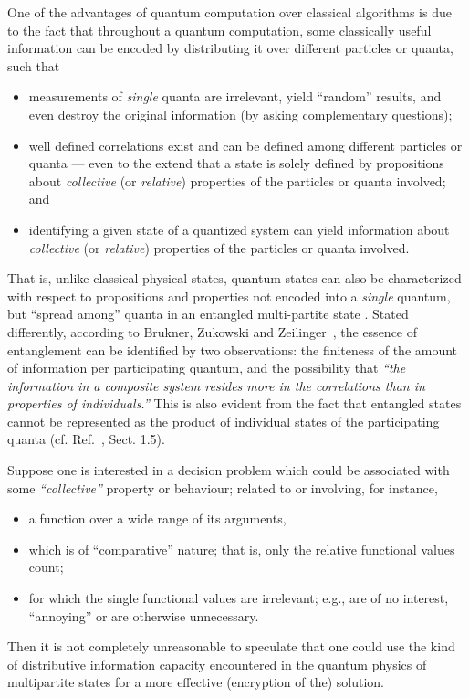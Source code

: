 \documentclass[pra,amsfonts,showpacs,showkeys,preprint]{revtex4}
\begin{document}
One of the advantages of quantum computation \cite{Gruska,nielsen-book,mermin-07,benn:97,Ozhigov:1997,bbcmw-01,cleve-99,fortnov-03}
over classical algorithms \cite{rogers1,odi:89} is due to
the fact that throughout a quantum computation, some classically useful information
can be encoded by distributing it over different particles or quanta,
such that \cite{mermin-02,svozil-2005-ko}
\begin{itemize}
\item
measurements of {\em single} quanta are irrelevant, yield ``random'' results,
and even destroy the original information (by asking complementary questions);
\item
well defined correlations exist and can be defined among different particles or quanta ---
even to the extend that a state is solely defined by propositions
about {\em collective} (or {\em relative})  properties of the particles or quanta involved;
and
\item
identifying a given state of a quantized system can yield information about
{\em collective} (or {\em relative})  properties of the particles or quanta involved.
\end{itemize}
That is, unlike classical physical states, quantum states can also be characterized with respect to
propositions and properties not encoded into a {\em single} quantum, but ``spread among''
quanta in an entangled multi-partite state
\cite{zeil-99,zeil-bruk-99,zeil-bruk-99a,zeil-bruk-02,DonSvo01,svozil-2002-statepart-prl,svozil-2003-garda}.
Stated differently, according to Brukner, Zukowski and Zeilinger~\cite{zeil-Zuk-bruk-01},
the essence of entanglement can be identified by two observations: the finiteness of the amount of information per participating quantum,
and the possibility that {\em ``the information in a composite system resides more
in the correlations than in properties of individuals.''}
This is also evident from the fact that entangled states cannot be represented as the product of individual states of the participating quanta
(cf. Ref.~\cite{mermin-07}, Sect. 1.5).

Suppose one is interested in a decision problem which could be associated with some {\em ``collective''} property or behaviour;
related to or involving, for instance,
\begin{itemize}
\item
a function over a wide range of its arguments,
\item
which is of ``comparative'' nature; that is, only the relative functional values count;
\item
for which the single functional values are irrelevant;
e.g., are of no interest, ``annoying'' or are otherwise unnecessary.
\end{itemize}
Then it is not completely unreasonable to speculate that one could use the
kind of distributive  information capacity encountered in the quantum physics of multipartite states
for a more effective (encryption of the) solution.
\end{document}
